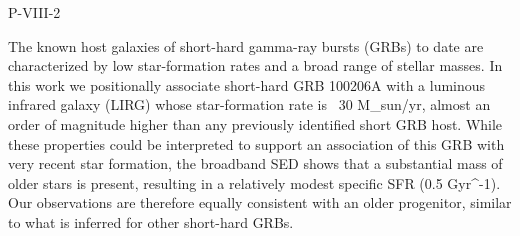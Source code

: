 P-VIII-2


\bigskip



\bigskip

\noindent The known host galaxies of short-hard gamma-ray bursts (GRBs) to date are characterized by low star-formation rates and a broad range of stellar masses.  In this work we positionally associate short-hard GRB 100206A with a luminous infrared galaxy (LIRG) whose star-formation rate is ~30 M_sun/yr, almost an order of magnitude higher than any previously identified short GRB host.  While these properties could be interpreted to support an association of this GRB with very recent star formation, the broadband SED shows that a substantial mass of older stars is present, resulting in a relatively modest specific SFR (0.5 Gyr^-1). Our observations are therefore equally consistent with an older progenitor, similar to what is  inferred for other short-hard GRBs.

